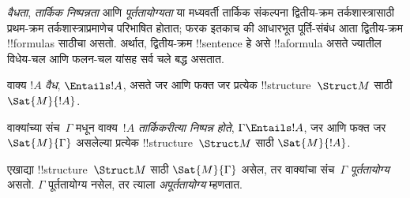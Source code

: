 \documentclass[../../../include/open-logic-section]{subfiles}
\begin{document}

\begin{explain}
\emph{वैधता},
\emph{तार्किक निष्पन्नता}
आणि
\emph{पूर्ततायोग्यता}
या मध्यवर्ती
तार्किक संकल्पना
द्वितीय-क्रम
तर्कशास्त्रासाठी
प्रथम-क्रम
तर्कशास्त्राप्रमाणेच
परिभाषित होतात;
फरक इतकाच की
आधारभूत पूर्ति-संबंध
आता द्वितीय-क्रम
!!{formula}s
साठीचा असतो.
अर्थात, द्वितीय-क्रम
!!{sentence}
हे असे
!!a{formula}
असते ज्यातील
विधेय-चल आणि
फलन-चल यांसह
सर्व चले
बद्ध असतात.
\end{explain}

\begin{defn}[वैधता]
वाक्य $!A$
\emph{वैध},
$\Entails !A$,
असते जर आणि
फक्त जर प्रत्येक
!!{structure}~$\Struct M$
साठी $\Sat{M}{!A}$.
\end{defn}

\begin{defn}[तार्किक निष्पन्नता]
वाक्यांच्या
संच~$\Gamma$
मधून वाक्य~$!A$
\emph{तार्किकरीत्या
निष्पन्न होते},
$\Gamma
\Entails !A$,
जर आणि फक्त जर
$\Sat{M}{\Gamma}$
असलेल्या प्रत्येक
!!{structure}~$\Struct M$
साठी
$\Sat{M}{!A}$.
\end{defn}

\begin{defn}[पूर्ततायोग्यता]
एखाद्या
!!{structure}~$\Struct M$
साठी
$\Sat{M}{\Gamma}$
असेल, तर वाक्यांचा
संच~$\Gamma$
\emph{पूर्ततायोग्य}
असतो.
$\Gamma$
पूर्ततायोग्य नसेल,
तर त्याला
\emph{अपूर्ततायोग्य}
म्हणतात.
\end{defn}
\end{document}
